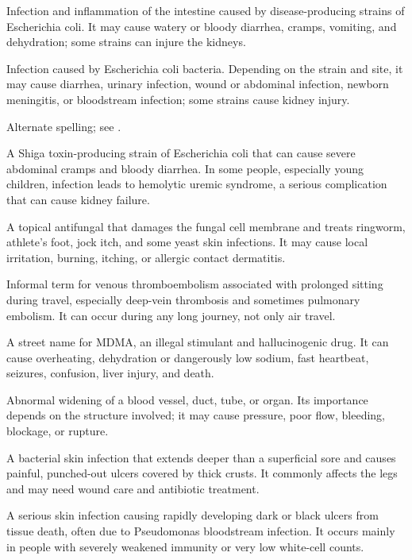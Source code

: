  Infection and inflammation of the intestine caused by disease-producing strains of Escherichia coli. It may cause watery or bloody diarrhea, cramps, vomiting, and dehydration; some strains can injure the kidneys.

 Infection caused by Escherichia coli bacteria. Depending on the strain and site, it may cause diarrhea, urinary infection, wound or abdominal infection, newborn meningitis, or bloodstream infection; some strains cause kidney injury.

 Alternate spelling; see .

 A Shiga toxin-producing strain of Escherichia coli that can cause severe abdominal cramps and bloody diarrhea. In some people, especially young children, infection leads to hemolytic uremic syndrome, a serious complication that can cause kidney failure.

 A topical antifungal that damages the fungal cell membrane and treats ringworm, athlete’s foot, jock itch, and some yeast skin infections. It may cause local irritation, burning, itching, or allergic contact dermatitis.

 Informal term for venous thromboembolism associated with prolonged sitting during travel, especially deep-vein thrombosis and sometimes pulmonary embolism. It can occur during any long journey, not only air travel.

 A street name for MDMA, an illegal stimulant and hallucinogenic drug. It can cause overheating, dehydration or dangerously low sodium, fast heartbeat, seizures, confusion, liver injury, and death.

 Abnormal widening of a blood vessel, duct, tube, or organ. Its importance depends on the structure involved; it may cause pressure, poor flow, bleeding, blockage, or rupture.

 A bacterial skin infection that extends deeper than a superficial sore and causes painful, punched-out ulcers covered by thick crusts. It commonly affects the legs and may need wound care and antibiotic treatment.

 A serious skin infection causing rapidly developing dark or black ulcers from tissue death, often due to Pseudomonas bloodstream infection. It occurs mainly in people with severely weakened immunity or very low white-cell counts.

